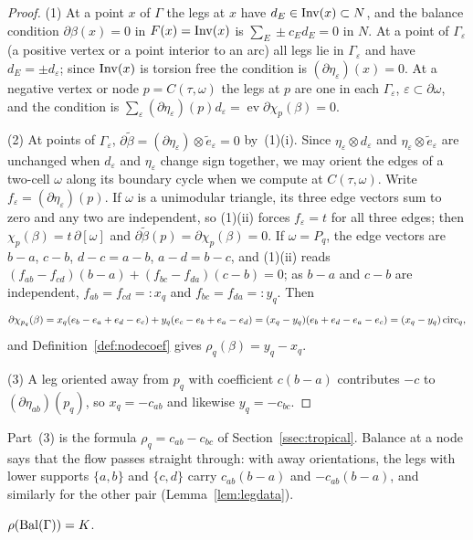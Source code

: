 \begin{proof}
(1) At a point $x$ of $\Gamma$ the legs at $x$ have $d_E\in\operatorname{Inv}(x)\subset N$, and the balance condition $\partial \beta(x)=0$
in $F(x)=\operatorname{Inv}(x)$ is $\sum_E\pm c_Ed_E=0$ in $N$. At a point of $\Gamma_\varepsilon$ (a positive vertex or a point
interior to an arc) all legs lie in $\Gamma_\varepsilon$ and have $d_E=\pm d_\varepsilon$; since $\operatorname{Inv}(x)$ is torsion
free the condition is $(\partial\eta_\varepsilon)(x)=0$. At a negative vertex or node $p=C(\tau,\omega)$ the legs at $p$
are one in each $\Gamma_\varepsilon$, $\varepsilon\subset\partial\omega$, and the condition is
$\sum_\varepsilon(\partial\eta_\varepsilon)(p)d_\varepsilon=\operatorname{ev}\partial\chi_p(\beta)=0$.

(2) At points of $\Gamma_\varepsilon$, $\partial\tilde\beta=(\partial\eta_\varepsilon)\otimes\tilde e_\varepsilon=0$ by~(1)(i). Since
$\eta_\varepsilon\otimes d_\varepsilon$ and $\eta_\varepsilon\otimes\tilde e_\varepsilon$ are unchanged when $d_\varepsilon$ and
$\eta_\varepsilon$ change sign together, we may orient the edges of a two-cell $\omega$ along its boundary cycle when we
compute at $C(\tau,\omega)$. Write $f_\varepsilon=(\partial\eta_\varepsilon)(p)$. If $\omega$ is a unimodular triangle, its
three edge vectors sum to zero and any two are independent, so (1)(ii) forces $f_\varepsilon=t$ for all three edges;
then $\chi_p(\beta)=t\,\partial[\omega]$ and $\partial\tilde\beta(p)=\partial\chi_p(\beta)=0$. If $\omega=P_q$, the edge vectors are
$b-a$, $c-b$, $d-c=a-b$, $a-d=b-c$, and (1)(ii) reads $(f_{ab}-f_{cd})(b-a)+(f_{bc}-f_{da})(c-b)=0$; as $b-a$ and $c-b$
are independent, $f_{ab}=f_{cd}=:x_q$ and $f_{bc}=f_{da}=:y_q$. Then
\[
\partial\chi_{p_q}(\beta)=x_q(e_b-e_a+e_d-e_c)+y_q(e_c-e_b+e_a-e_d)=(x_q-y_q)(e_b+e_d-e_a-e_c)=(x_q-y_q)\,\mathrm{circ}_q ,
\]
and Definition~\ref{def:nodecoef} gives $\rho_q(\beta)=y_q-x_q$.

(3) A leg oriented away from $p_q$ with coefficient $c(b-a)$ contributes $-c$ to $(\partial\eta_{ab})(p_q)$, so
$x_q=-c_{ab}$ and likewise $y_q=-c_{bc}$.
\end{proof}

Part~(3) is the formula $\rho_q=c_{ab}-c_{bc}$ of Section~\ref{ssec:tropical}. Balance at a node says that the flow
passes straight through: with away orientations, the legs with lower supports $\{a,b\}$ and $\{c,d\}$ carry
$c_{ab}(b-a)$ and $-c_{ab}(b-a)$, and similarly for the other pair (Lemma~\ref{lem:legdata}).

\begin{proposition}\label{prop:rhoH}
$\rho(\mathrm{Bal}(\Gamma))=K$.
\end{proposition}

